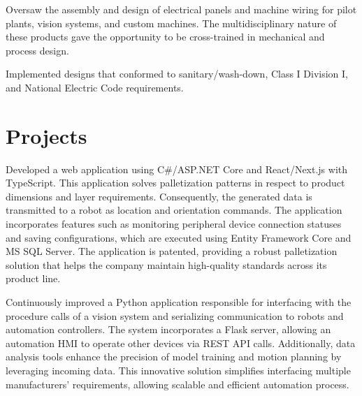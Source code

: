 \documentclass{TTurner}
\begin{document}
\begin{minipage}[t]{0.75\textwidth}
\begin{tightemize}
\sectionsep
\item Oversaw the assembly and design of electrical panels and machine wiring for pilot plants, vision systems, and custom machines. The multidisciplinary nature of these products gave the opportunity to be cross-trained in mechanical and process design. 
\item Implemented designs that conformed to sanitary/wash-down, Class I Division I, and National Electric Code requirements.              
\end{tightemize}
\sectionsep

\section{Projects}

\begin{tightemize}
\item Developed a web application using C\#/ASP.NET Core and React/Next.js with TypeScript. This application solves palletization patterns in respect to product dimensions and layer requirements. Consequently, the generated data is transmitted to a robot as location and orientation commands. The application incorporates features such as monitoring peripheral device connection statuses and saving configurations, which are executed using Entity Framework Core and MS SQL Server. The application is patented, providing a robust palletization solution that helps the company maintain high-quality standards across its product line.
\end{tightemize}
\sectionsep

\begin{tightemize}
\item Continuously improved a Python application responsible for interfacing with the procedure calls of a vision system and serializing communication to robots and automation controllers. The system incorporates a Flask server, allowing an automation HMI to operate other devices via REST API calls. Additionally, data analysis tools enhance the precision of model training and motion planning by leveraging incoming data. This innovative solution simplifies interfacing multiple manufacturers' requirements, allowing scalable and efficient automation process.
\end{tightemize}
\sectionsep


\end{minipage}
\end{document}

